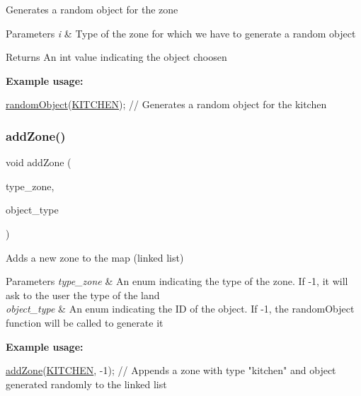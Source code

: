 Generates a random object for the zone 
\begin{DoxyParams}{Parameters}
{\em i} & Type of the zone for which we have to generate a random object \\
\hline
\end{DoxyParams}
\begin{DoxyReturn}{Returns}
An int value indicating the object choosen
\end{DoxyReturn}
{\bfseries Example usage\+:} 
\begin{DoxyCode}
\hyperlink{group__map_ga14c46e63cc9c0b8cbc9b48efcde61609}{randomObject}(\hyperlink{gamelib_8h_a8bc11a12fbea40ab4ffab0cfcfa9b5afa4ee84499c713a291f1748ca7207f19ca}{KITCHEN}); \textcolor{comment}{// Generates a random object for the kitchen}
\end{DoxyCode}
 \mbox{\label{group__map_ga62518152079402c1d5dd4d7cb135ebb6}} 
\subsubsection{\texorpdfstring{add\+Zone()}{addZone()}}
{\footnotesize\ttfamily void add\+Zone (\begin{DoxyParamCaption}\item[{\hyperlink{gamelib_8h_a8bc11a12fbea40ab4ffab0cfcfa9b5af}{Type\+Zone}}]{type\+\_\+zone,  }\item[{\hyperlink{gamelib_8h_a21ada50c882656c2a4723dde25f56d4a}{Obj\+Type}}]{object\+\_\+type }\end{DoxyParamCaption})\hspace{0.3cm}{\ttfamily [static]}}

Adds a new zone to the map (linked list) 
\begin{DoxyParams}{Parameters}
{\em type\+\_\+zone} & An enum indicating the type of the zone. If -\/1, it will ask to the user the type of the land \\
\hline
{\em object\+\_\+type} & An enum indicating the ID of the object. If -\/1, the random\+Object function will be called to generate it\\
\hline
\end{DoxyParams}
{\bfseries Example usage\+:} 
\begin{DoxyCode}
\hyperlink{group__map_ga62518152079402c1d5dd4d7cb135ebb6}{addZone}(\hyperlink{gamelib_8h_a8bc11a12fbea40ab4ffab0cfcfa9b5afa4ee84499c713a291f1748ca7207f19ca}{KITCHEN}, -1); \textcolor{comment}{// Appends a zone with type "kitchen" and object generated randomly to
       the linked list}
\end{DoxyCode}


